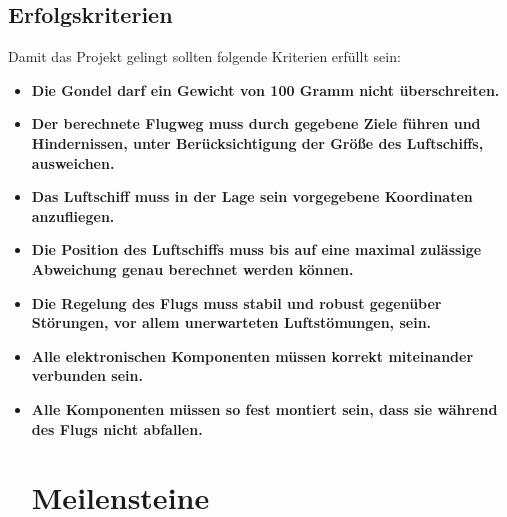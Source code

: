 \documentclass[lang=ngerman,inputenc=utf8,fontsize=10pt]{ldvarticle}
\begin{document}
\subsection*{Erfolgskriterien}
Damit das Projekt gelingt sollten folgende Kriterien erfüllt sein:
\begin{itemize}
\item \textbf{Die Gondel darf ein Gewicht von 100 Gramm nicht überschreiten.}
\item \textbf{Der berechnete Flugweg muss durch gegebene Ziele führen und Hindernissen, unter Berücksichtigung der Größe des Luftschiffs, ausweichen.}
\item \textbf{Das Luftschiff muss in der Lage sein vorgegebene Koordinaten anzufliegen.}
\item \textbf{Die Position des Luftschiffs muss bis auf eine maximal zulässige Abweichung genau berechnet werden können.}
\item \textbf{Die Regelung des Flugs muss stabil und robust gegenüber Störungen, vor allem unerwarteten Luftstömungen, sein.}
\item \textbf{Alle elektronischen Komponenten müssen korrekt miteinander verbunden sein.}
\item \textbf{Alle Komponenten müssen so fest montiert sein, dass sie während des Flugs nicht abfallen.}


\section{Meilensteine}
\end{itemize}
\end{document}
